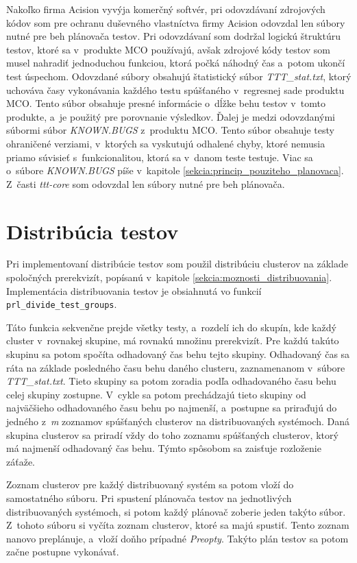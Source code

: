 Nakoľko firma Acision vyvýja komerčný softvér, pri odovzdávaní zdrojových kódov 
som pre ochranu duševného vlastníctva firmy Acision odovzdal len súbory nutné pre 
beh plánovača testov. Pri odovzdávaní som dodržal logickú štruktúru testov, ktoré sa
v~produkte MCO používajú, avšak zdrojové kódy testov som musel nahradiť jednoduchou funkciou,
ktorá počká náhodný čas a~potom ukončí test úspechom.
Odovzdané súbory obsahujú štatistický súbor \textit{TTT\_stat.txt}, ktorý uchováva časy vykonávania
každého testu spúšťaného v~regresnej sade produktu MCO. Tento súbor obsahuje presné informácie o~dĺžke
behu testov v~tomto produkte, a~je použitý pre porovnanie výsledkov.
Ďalej je medzi odovzdanými súbormi súbor \textit{KNOWN.BUGS} z~produktu MCO. Tento súbor obsahuje testy
ohraničené verziami, v~ktorých sa vyskutujú odhalené chyby, ktoré nemusia priamo súvisieť
s~funkcionalitou, ktorá sa v~danom teste testuje. Viac sa o~súbore \textit{KNOWN.BUGS} píše v~kapitole \ref{sekcia:princip_pouziteho_planovaca}.
Z~časti \textit{ttt-core} som odovzdal len súbory nutné pre beh plánovača. 

\section{Distribúcia testov}
\label{sekcia:distribucia_testov}
Pri implementovaní distribúcie testov som použil distribúciu clusterov na základe spoločných prerekvizít, 
popísanú v~kapitole \ref{sekcia:moznosti_distribuovania}.
Implementácia distribuovania testov je obsiahnutá vo funkcií \texttt{prl\_divide\_test\_groups}.

Táto funkcia sekvenčne prejde všetky testy, a~rozdelí ich do skupín, kde každý cluster v~rovnakej skupine,
má rovnakú množinu prerekvizít. Pre každú takúto skupinu sa potom spočíta odhadovaný čas behu tejto skupiny.
Odhadovaný čas sa ráta na základe posledného času behu daného clusteru, zaznamenanom v~súbore \textit{TTT\_stat.txt}.
Tieto skupiny sa potom zoradia podľa odhadovaného času behu celej skupiny zostupne.
V~cykle sa potom prechádzajú tieto skupiny od najväčšieho odhadovaného času behu po najmenší, a~postupne sa priraďujú 
do jedného z~\emph{m} zoznamov spúšťaných clusterov na distribuovaných systémoch.
Daná skupina clusterov sa priradí vždy do toho zoznamu spúšťaných clusterov, ktorý má
najmenší odhadovaný čas behu. Týmto spôsobom sa zaisťuje rozloženie záťaže. 

Zoznam clusterov pre každý distribuovaný systém sa potom vloží do samostatného súboru.
Pri spustení plánovača testov na jednotlivých distribuovaných systémoch, si potom každý
plánovač zoberie jeden takýto súbor. Z~tohoto súboru si vyčíta zoznam clusterov,
ktoré sa majú spustiť. Tento zoznam nanovo preplánuje, a~vloží doňho prípadné \textit{Preopty}.
Takýto plán testov sa potom začne postupne vykonávať.

